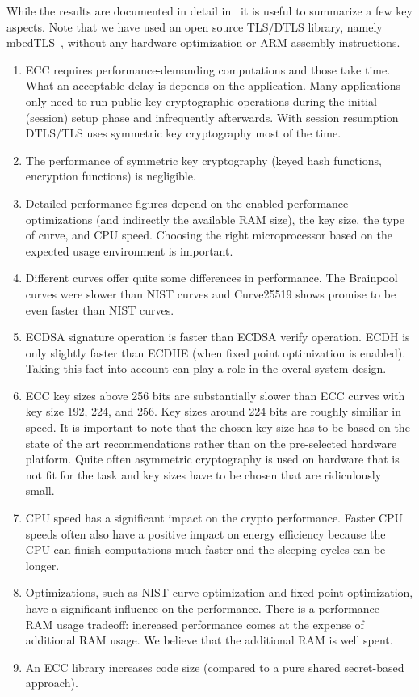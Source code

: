 \documentclass[peerreview, a4paper, draft, 7pt]{IEEEtran}
\begin{document}
While the results are documented in detail in~\cite{LWIG} it is useful to summarize a few key aspects. Note that we have used an open source TLS/DTLS library, namely mbedTLS~\cite{mbedTLS}, without any hardware optimization or ARM-assembly instructions. 

\begin{enumerate}
\item ECC requires performance-demanding computations and those take time. What an acceptable delay is depends on the application. Many applications only need to run public key cryptographic operations during the initial (session) setup phase and infrequently afterwards. With session resumption DTLS/TLS uses symmetric key cryptography most of the time.
\item The performance of symmetric key cryptography (keyed hash functions, encryption functions) is negligible.  
\item Detailed performance figures depend on the enabled performance optimizations (and indirectly the available RAM size), the key size, the type of curve, and CPU speed. Choosing the right microprocessor based on the expected usage environment is important. 
\item Different curves offer quite some differences in performance. The Brainpool curves were slower than NIST curves and Curve25519 shows promise to be even faster than NIST curves.  
\item ECDSA signature operation is faster than ECDSA verify operation. ECDH is only slightly faster than ECDHE (when fixed point optimization is enabled). Taking this fact into account can play a role in the overal system design.
\item ECC key sizes above 256 bits are substantially slower than ECC curves with key size 192, 224, and 256. Key sizes around 224 bits are roughly similiar in speed. It is important to note that the chosen key size has to be based on the state of the art recommendations rather than on the pre-selected hardware platform. Quite often asymmetric cryptography is used on hardware that is not fit for the task and key sizes have to be chosen that are ridiculously small. 
\item CPU speed has a significant impact on the crypto performance. Faster CPU speeds often also have a positive impact on energy efficiency because the CPU can finish computations much faster and the sleeping cycles can be longer. 
\item Optimizations, such as NIST curve optimization and fixed point optimization, have a significant influence on the performance. There is a performance - RAM usage tradeoff: increased performance comes at the expense of additional RAM usage. We believe that the additional RAM is well spent. 
\item An ECC library increases code size (compared to a pure shared secret-based approach).
\end{enumerate}
\end{document}
